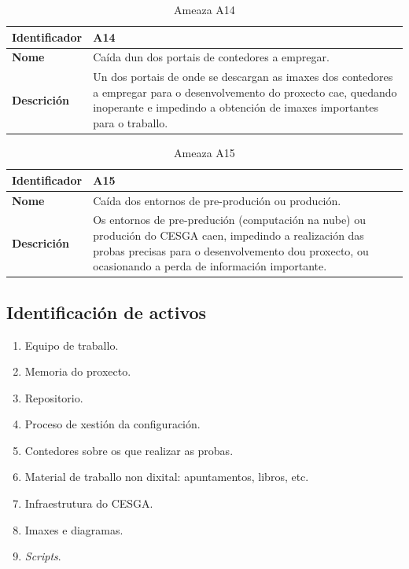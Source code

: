 \begin{table}[H]
\caption{Ameaza A14}
\label{A14}
\begin{tabularx}{\textwidth}{|l|X|}
\hline
\textbf{Identificador} & A14 \\ \hline
\textbf{Nome} & Caída dun dos portais de contedores a empregar. \\ \hline
\textbf{Descrición} & Un dos portais de onde se descargan as imaxes dos contedores a empregar para o desenvolvemento do proxecto cae, quedando inoperante e impedindo a obtención de imaxes importantes para o traballo. \\ \hline
\end{tabularx}
\end{table}

\begin{table}[H]
\caption{Ameaza A15}
\label{A15}
\begin{tabularx}{\textwidth}{|l|X|}
\hline
\textbf{Identificador} & A15 \\ \hline
\textbf{Nome} & Caída dos entornos de pre-produción ou produción. \\ \hline
\textbf{Descrición} & Os entornos de pre-predución (computación na nube) ou produción do \gls{CESGA} caen, impedindo a realización das probas precisas para o desenvolvemento dou proxecto, ou ocasionando a perda de información importante. \\ \hline
\end{tabularx}
\end{table}

\subsection{Identificación de activos}

\begin{enumerate}[{ACT}1: ]
    \item Equipo de traballo.
    \item Memoria do proxecto.
    \item Repositorio.
    \item Proceso de xestión da configuración.
    \item Contedores sobre os que realizar as probas.
    \item Material de traballo non dixital: apuntamentos, libros, etc.
    \item Infraestrutura do \gls{CESGA}.
    \item Imaxes e diagramas.
    \item \textit{Scripts}.
\end{enumerate}

